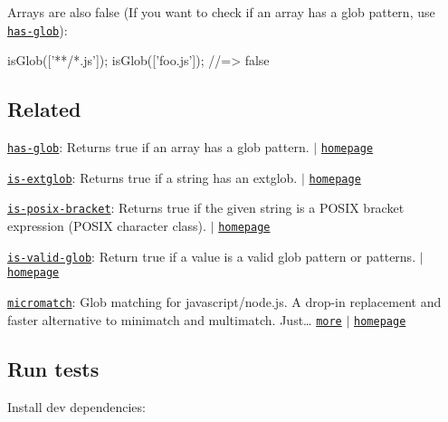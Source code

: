 Arrays are also {\ttfamily false} (If you want to check if an array has a glob pattern, use \href{https://github.com/jonschlinkert/has-glob}{\tt has-\/glob})\+:


\begin{DoxyCode}
isGlob(['**/*.js']);
isGlob(['foo.js']);
//=> false
\end{DoxyCode}


\subsection*{Related}


\begin{DoxyItemize}
\item \href{https://www.npmjs.com/package/has-glob}{\tt has-\/glob}\+: Returns {\ttfamily true} if an array has a glob pattern. $\vert$ \href{https://github.com/jonschlinkert/has-glob}{\tt homepage}
\item \href{https://www.npmjs.com/package/is-extglob}{\tt is-\/extglob}\+: Returns true if a string has an extglob. $\vert$ \href{https://github.com/jonschlinkert/is-extglob}{\tt homepage}
\item \href{https://www.npmjs.com/package/is-posix-bracket}{\tt is-\/posix-\/bracket}\+: Returns true if the given string is a P\+O\+S\+IX bracket expression (P\+O\+S\+IX character class). $\vert$ \href{https://github.com/jonschlinkert/is-posix-bracket}{\tt homepage}
\item \href{https://www.npmjs.com/package/is-valid-glob}{\tt is-\/valid-\/glob}\+: Return true if a value is a valid glob pattern or patterns. $\vert$ \href{https://github.com/jonschlinkert/is-valid-glob}{\tt homepage}
\item \href{https://www.npmjs.com/package/micromatch}{\tt micromatch}\+: Glob matching for javascript/node.\+js. A drop-\/in replacement and faster alternative to minimatch and multimatch. Just… \href{https://www.npmjs.com/package/micromatch}{\tt more} $\vert$ \href{https://github.com/jonschlinkert/micromatch}{\tt homepage}
\end{DoxyItemize}

\subsection*{Run tests}

Install dev dependencies\+:




